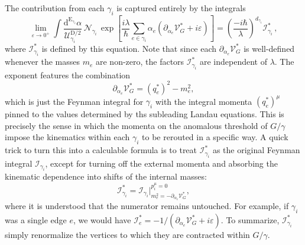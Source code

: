 \documentclass[12pt]{article}
\numberwithin{figure}{section}
\def \be {\begin{equation}}
\def \ee {\end{equation}}
\def \D {\mathrm{D}}
\def \E {\mathrm{E}}
\def \U {\mathcal{U}}
\def \d {\mathrm{d}}
\def \eps {\varepsilon}
\def \V {\mathcal{V}}
\def \I {\mathcal{I}}
\def \N {\mathcal{N}}
\def \RR {\mathcal{I}^\ast}
\begin{document}
                The contribution from each $\gamma_i$ is captured entirely by the integrals
				\be\label{eq:Rgamma}
				\lim_{\eps\to 0^+} \int \frac{\d^{\E_{\gamma_i}} \alpha}{\U_{\gamma_i}^{\D/2}}\,\N_{\gamma_i}\, \exp \left[{\frac{i\lambda}{\hbar} \sum_{e \in \gamma_i} \alpha_e (\partial_{\alpha_e} \V_{G}^\ast + i\eps)}\right] = \left(\frac{-i\hbar}{\lambda}\right)^{\!d_{\gamma_i}} \RR_{\gamma_i}\,,
				\ee
				where $\RR_{\gamma_i}$ is defined by this equation. Note that since each $\partial_{\alpha_e} \V_{G}^\ast$ is well-defined whenever the masses $m_e$ are non-zero, the factors $\RR_{\gamma_i}$ are independent of $\lambda$.
 				The exponent features the combination
				\be
				\partial_{\alpha_e} \V_G^\ast = (q_e^\ast)^2 - m_e^2,
				\ee
				which is just the Feynman integral for $\gamma_i$ with the integral momenta $(q_e^\ast)^\mu$ pinned to the values determined by ths subleading Landau equations. This is precisely the sense in which the momenta on the anomalous threshold of $G/\gamma$ impose the kinematics within each $\gamma_i$ to be rerouted in a specific way. A quick trick to turn this into a calculable formula is to treat $\RR_{\gamma_i}$ as the original Feynman integral $\I_{\gamma_i}$, except for turning off the external momenta and absorbing the kinematic dependence into shifts of the internal masses: 
				\be
				\RR_{\gamma_i} = \I_{\gamma_i} \big|^{p_i^\mu = 0}_{m_e^2 = -\partial_{\alpha_e}\V_{G}^\ast},
				\ee
				where it is understood that the numerator remains untouched.
				For example, if $\gamma_i$ was a single edge $e$, we would have $\RR_{e} = -1/(\partial_{\alpha_e}\V_{G}^\ast + i\eps)$. To summarize, $\RR_{\gamma_i}$ simply renormalize the vertices to which they are contracted within $G/\gamma$.
				
\end{document}

